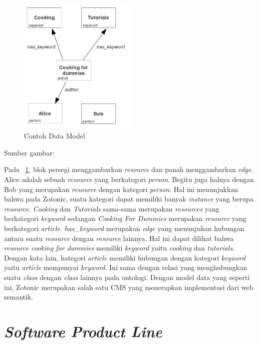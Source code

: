 \begin{figure}
	\centering
	\includegraphics[width=0.5\textwidth]
	{pics/dataModel.png}
	\caption{Contoh Data Model}
	\label{fig:dataModel}
\end{figure}
\vspace{-1cm}
\begin{center}
{\small Sumber gambar: \citep{zotonic.model}}
\end{center}

Pada \pic~\ref{fig:dataModel}, blok persegi menggambarkan \textit{resource} dan panah menggambarkan \textit{edge}. Alice adalah sebuah \textit{resource} yang berkategori \textit{person}. Begitu juga halnya dengan Bob yang merupakan \textit{resource} dengan kategori \textit{person}. Hal ini menunjukkan bahwa pada Zotonic, suatu kategori dapat memiliki banyak \textit{instance} yang berupa \textit{resource}. \textit{Cooking} dan \textit{Tutorials} sama-sama merupakan \textit{resources} yang berkategori \textit{keyword} sedangan \textit{Cooking For Dummies} merupakan \textit{resource} yang berkategori \textit{article}. \textit{has\_keyword} merupakan \textit{edge} yang menunjukan hubungan antara suatu \textit{resource} dengan \textit{resource} lainnya. Hal ini dapat dilihat bahwa \textit{resource cooking for dummies} memiliki \textit{keyword} yaitu \textit{cooking} dan \textit{tutorials}. Dengan kata lain, kategori \textit{article} memiliki hubungan dengan kategori \textit{keyword} yaitu \textit{article} mempunyai \textit{keyword}. Ini sama dengan relasi yang menghubungkan suatu \textit{class} dengan \textit{class} lainnya pada ontologi. Dengan model data yang seperti ini, Zotonic merupakan salah satu CMS yang menerapkan implementasi dari web semantik.
\section{\textit{Software Product Line}}

